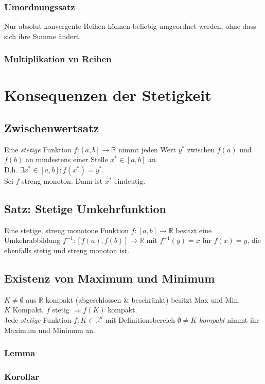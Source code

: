 \documentclass[10pt,a4paper^, twocolumn]{article}
\newcommand{\R}{\mathbb{R}}
\begin{document}
		\subsubsection{Umordnungssatz}
			Nur absolut konvergente Reihen können beliebig umgeordnet werden, ohne dass
			sich ihre Summe ändert.
		\subsubsection{Multiplikation vn Reihen}
			
		
\section{Konsequenzen der Stetigkeit}
	\subsection{Zwischenwertsatz} 
		Eine \textit{stetige} Funktion $f: [a, b] \to \R$ nimmt jeden Wert $y^*$ zwischen
		$f(a)$ und $f(b)$ an mindestens einer Stelle $x^* \in [a,b]$ an.\\
		D.h. $\exists x^* \in [a,b]: f(x^*) = y^*$.\\
		Sei $f$ streng monoton. Dann ist $x^*$ eindeutig.
	\subsection{Satz: Stetige Umkehrfunktion}
		Eine stetige, streng monotone Funktion $f: [a, b] \to \R$ besitzt eine
		Umkehrabbildung $f^{-1} : [f(a), f(b)] \to \R$ mit $f^{-1}(y) = x$ für $f(x) = y$,
		die ebenfalls stetig und streng monoton ist.
	\subsection{Existenz von Maximum und Minimum}
	$K \neq \emptyset$ aus $\R$ kompakt (abgeschlossen \& beschränkt) besitzt Max und Min.\\
	$K$ Kompakt, $f$ stetig $\Rightarrow f(K) $ kompakt.\\
	Jede \emph{stetige} Funktion $f: K \in \R^d$ mit Definitionsbereich $\emptyset \neq K$
	\emph{kompakt} nimmt ihr Maximum und Minimum an.
		\subsubsection{Lemma}
		\subsubsection{Korollar}
\end{document}
